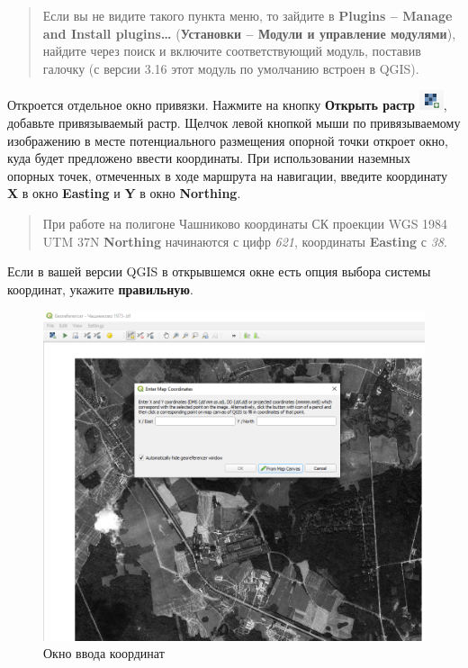\documentclass[
  12pt,
]{book}
\begin{document}
\begin{quote}
Если вы не видите такого пункта меню, то зайдите в \textbf{Plugins -- Manage and Install plugins\ldots{}} (\textbf{Установки -- Модули и управление модулями}), найдите через поиск и включите соответствующий модуль, поставив галочку (с версии 3.16 этот модуль по умолчанию встроен в QGIS).
\end{quote}

Откроется отдельное окно привязки. Нажмите на кнопку \textbf{Открыть растр} \includegraphics{images/Practice/Open_raster.png}, добавьте привязываемый растр. Щелчок левой кнопкой мыши по привязываемому изображению в месте потенциального размещения опорной точки откроет окно, куда будет предложено ввести координаты. При использовании наземных опорных точек, отмеченных в ходе маршрута на навигации, введите координату \textbf{X} в окно \textbf{Easting} и \textbf{Y} в окно \textbf{Northing}.

\begin{quote}
При работе на полигоне Чашниково координаты СК проекции WGS 1984 UTM 37N \textbf{Northing} начинаются с цифр \emph{621}, координаты \textbf{Easting} с \emph{38}.
\end{quote}

Если в вашей версии QGIS в открывшемся окне есть опция выбора системы координат, укажите \textbf{правильную}.

\begin{figure}
\centering
\includegraphics{images/Practice/Enter_Coordinates.png}
\caption{Окно ввода координат}
\end{figure}
\end{document}
